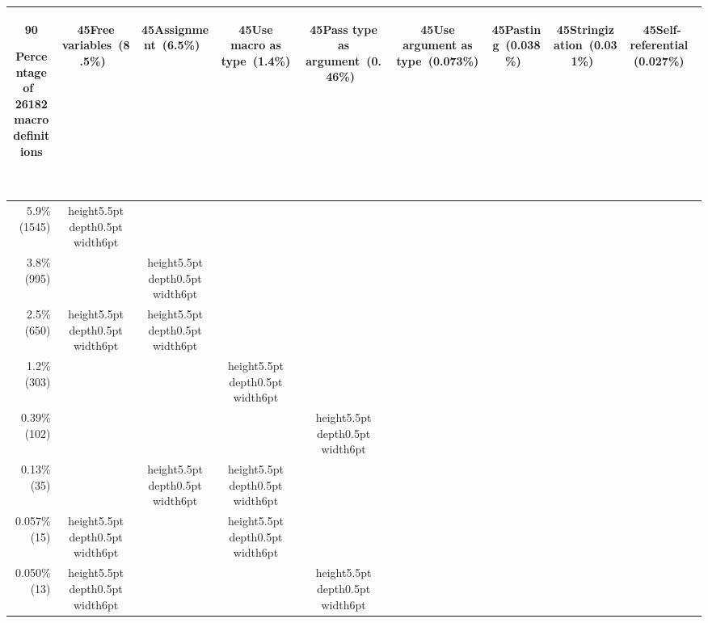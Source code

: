 
\newcommand{\black}{\vrule height5.5pt depth0.5pt width6pt}
{\footnotesize
\addtolength{\tabcolsep}{-.4\tabcolsep}
\begin{tabular}{|r|*{8}{c|}}
\multicolumn{1}{c}{\begin{rotate}{90}{\parbox{1in}{Percentage of~ \\ 26182 macro \\ definitions}~}\end{rotate}} &
\multicolumn{1}{c}{\begin{rotate}{45}{Free variables~(8.5\%)~}\end{rotate}} &
\multicolumn{1}{c}{\begin{rotate}{45}{Assignment~(6.5\%)~}\end{rotate}} &
\multicolumn{1}{c}{\begin{rotate}{45}{Use macro as type~(1.4\%)~}\end{rotate}} &
\multicolumn{1}{c}{\begin{rotate}{45}{Pass type as argument~(0.46\%)~}\end{rotate}} &
\multicolumn{1}{c}{\begin{rotate}{45}{Use argument as type~(0.073\%)~}\end{rotate}} &
\multicolumn{1}{c}{\begin{rotate}{45}{Pasting~(0.038\%)~}\end{rotate}} &
\multicolumn{1}{c}{\begin{rotate}{45}{Stringization~(0.031\%)~}\end{rotate}} &
\multicolumn{1}{c}{\begin{rotate}{45}{Self-referential~(0.027\%)~}\end{rotate}}
\\ \hline
5.9\% (1545)&\black& & & & & & & \\ \hline
3.8\% (995)& &\black& & & & & & \\ \hline
2.5\% (650)&\black&\black& & & & & & \\ \hline
1.2\% (303)& & &\black& & & & & \\ \hline
0.39\% (102)& & & &\black& & & & \\ \hline
0.13\% (35)& &\black&\black& & & & & \\ \hline
0.057\% (15)&\black& &\black& & & & & \\ \hline
0.050\% (13)&\black& & &\black& & & & \\ \hline

\end{tabular}}
